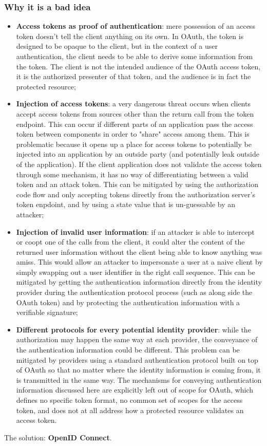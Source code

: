 \documentclass[a4paper, 10pt, titlepage]{article}
\begin{document}
\subsubsection*{Why it is a bad idea}
\begin{itemize}
\item \textbf{Access tokens as proof of authentication}: mere possession of an access token doesn't tell the client anything on its own. In OAuth, the token is designed to be opaque to the client, but in the context of a user authentication, the client needs to be able to derive some information from the token. The client is not the intended audience of the OAuth access token, it is the authorized presenter of that token, and the audience is in fact the protected resource;
\item \textbf{Injection of access tokens}: a very dangerous threat occurs when clients accept access tokens from sources other than the return call from the token endpoint. This can occur if different parts of an application pass the access token between components in order to "share" access among them. This is problematic because it opens up a place for access tokens to potentially be injected into an application by an outside party (and potentially leak outside of the application). If the client application does not validate the access token through some mechanism, it has no way of differentiating between a valid token and an attack token. This can be mitigated by using the authorization code flow and only accepting tokens directly from the authorization server's token enpdoint, and by using a state value that is un-guessable by an attacker;
\item \textbf{Injection of invalid user information}: if an attacker is able to intercept or coopt one of the calls from the client, it could alter the content of the returned user information without the client being able to know anything was amiss. This would allow an attacker to impersonate a user at a naive client by simply swapping out a user identifier in the right call sequence. This can be mitigated by getting the authentication information directly from the identity provider during the authentication protocol process (such as along side the OAuth token) and by protecting the authentication information with a verifiable signature;
\item \textbf{Different protocols for every potential identity provider}: while the authorization may happen the same way at each provider, the conveyance of the authentication information could be different. This problem can be mitigated by providers using a standard authentication protocol built on top of OAuth so that no matter where the identity information is coming from, it is transmitted in the same way. The mechanisms for conveying authentication information discussed here are explicitly left out
of scope for OAuth, which defines no specific token format, no common set of scopes for the access token, and does not at all address how a protected resource validates an access token.
\end{itemize}
The solution: \textbf{OpenID Connect}.
\end{document}
